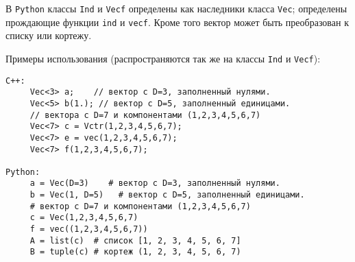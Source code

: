 В  {\tt Python} классы {\tt Ind} и {\tt Vecf} определены как наследники класса {\tt Vec}; определены прождающие функции
{\tt ind} и {\tt vecf}. Кроме того вектор может быть преобразован к списку или кортежу.

Примеры использования (распространяются так же на классы {\tt Ind} и {\tt Vecf}):
\begin{verbatim}
C++:
     Vec<3> a;    // вектор с D=3, заполненный нулями.
     Vec<5> b(1.); // вектор с D=5, заполненный единицами.
     // вектора с D=7 и компонентами (1,2,3,4,5,6,7)
     Vec<7> c = Vctr(1,2,3,4,5,6,7);  
     Vec<7> e = vec(1,2,3,4,5,6,7); 
     Vec<7> f(1,2,3,4,5,6,7); 

Python:
     a = Vec(D=3)    # вектор с D=3, заполненный нулями.
     b = Vec(1, D=5)   # вектор с D=5, заполненный единицами.
     # вектор с D=7 и компонентами (1,2,3,4,5,6,7)
     c = Vec(1,2,3,4,5,6,7) 
     f = vec((1,2,3,4,5,6,7)) 
     A = list(c)  # список [1, 2, 3, 4, 5, 6, 7]
     B = tuple(c) # кортеж (1, 2, 3, 4, 5, 6, 7)
\end{verbatim}


